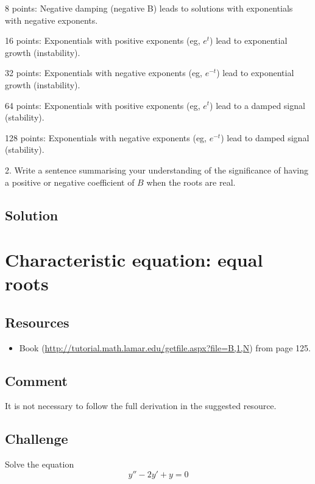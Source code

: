 8 points: Negative damping (negative B) leads to solutions with exponentials with negative exponents.

16 points: Exponentials with positive exponents (eg, $e^{t}$) lead to exponential growth (instability).

32 points: Exponentials with negative exponents (eg, $e^{-t}$) lead to exponential growth (instability).

64 points: Exponentials with positive exponents (eg, $e^{t}$) lead to a damped signal (stability).

128 points: Exponentials with negative exponents (eg, $e^{-t}$) lead to damped signal (stability).

\vspace{2em}

2. Write a sentence summarising your understanding of the significance of having a positive or negative coefficient of $B$ when the roots are real.


\subsection*{Solution}

\timebox




\newpage
\section{Characteristic equation: equal roots}

\subsection*{Resources}
\begin{itemize}
    \item Book (\url{http://tutorial.math.lamar.edu/getfile.aspx?file=B,1,N}) from page 125.
\end{itemize}

\subsection*{Comment}
It is not necessary to follow the full derivation in the suggested resource.

\subsection*{Challenge}
Solve the equation
\begin{equation}
    y'' - 2y' + y = 0
\end{equation}

